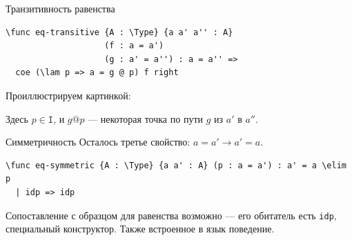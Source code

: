\documentclass[aspectratio=169]{beamer}
\begin{document}
\begin{frame}[fragile]{Транзитивность равенства}


\small\color[HTML]{025002}\begin{verbatim}
\func eq-transitive {A : \Type} {a a' a'' : A}
                    (f : a = a')
                    (g : a' = a'') : a = a'' =>
  coe (\lam p => a = g @ p) f right
\end{verbatim}\normalsize
\color{black}




Проиллюстрируем картинкой:\vspace{-0.2cm}
\begin{center}\end{center}\vspace{-0.3cm}
Здесь $p \in \texttt{I}$, и $g @ p$ --- некоторая точка по пути $g$ из $a'$ в $a''$.

\end{frame}

\begin{frame}[fragile]{Симметричность}
Осталось третье свойство: $a = a' \rightarrow a' = a$.

\small\color[HTML]{025002}\begin{verbatim}
\func eq-symmetric {A : \Type} {a a' : A} (p : a = a') : a' = a \elim p
  | idp => idp
\end{verbatim}\normalsize
\color{black}

Сопоставление с образцом для равенства возможно --- 
его обитатель есть \verb!idp!, специальный конструктор. Также встроенное в язык поведение.


\end{frame}
\end{document}

